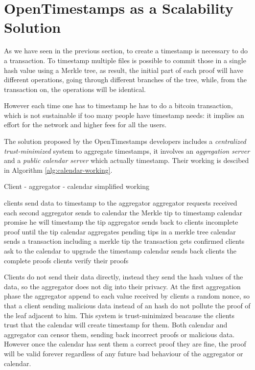 \section{OpenTimestamps as a Scalability Solution}
As we have seen in the previous section, to create a timestamp is necessary to do a transaction. 
To timestamp multiple files is possible to commit those in a single hash value using a Merkle tree, as result, the initial part of each proof will have different operations, going through different branches of the tree, while, from the transaction on, the operations will be identical.

However each time one has to timestamp he has to do a bitcoin transaction, which is not sustainable if too many people have timestamp needs: it implies an effort for the network and higher fees for all the users.

The solution proposed by the OpenTimestamps developers includes a \textit{centralized trust-minimized} system to aggregate timestamps, it involves an \textit{aggregation server} and a \textit{public calendar server} which actually timestamp.
Their working is descibed in Algorithm \ref{alg:calendar-working}.

\begin{algorithm}
	\caption{Client - aggregator - calendar simplified working}
	\label{alg:calendar-working}
	\begin{algorithmic}[1]
		\State clients send data to timestamp to the aggregator
		\State aggregator  requests received each second
		\State aggregator sends to calendar the Merkle tip to timestamp
		\State calendar promise he will timestamp the tip
		\State aggregator sends back to clients incomplete proof until the tip
		\State calendar aggregates pending tips in a merkle tree
		\State calendar sends a transaction including a merkle tip
		\State the transaction gets confirmed
		\State clients ask to the calendar to upgrade the timestamp
		\State calendar sends back clients the complete proofs
		\State clients verify their proofs
	\end{algorithmic}	
\end{algorithm}

Clients do not send their data directly, instead they send the hash values of the data, so the aggregator does not dig into their privacy.
At the first aggregation phase the aggregator append to each value received by clients a random nonce, so that a client sending malicious data instead of an hash do not pollute the proof of the leaf adjacent to him.
This system is trust-minimized beacause the clients trust that the calendar will create timestamp for them. Both calendar and aggregator can censor them, sending back incorrect proofs or malicious data. However once the calendar has sent them a correct proof they are fine, the proof will be valid forever regardless of any future bad behaviour of the aggregator or calendar.

